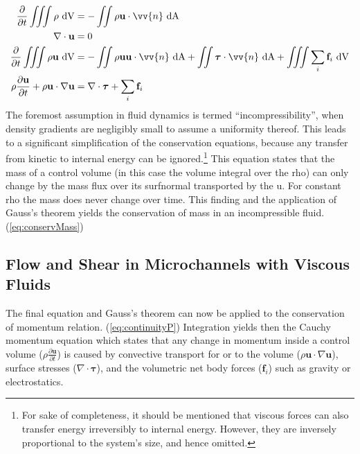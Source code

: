 \begin{align}
	\frac{\partial}{\partial t} \iiint \rho \ \mathrm{dV} &= - \iint \rho \mathbf{u} \cdot \vv{n} \ \mathrm{dA} \label{eq:continuityM}\\
	\nabla \cdot \mathbf{u} &= 0 \label{eq:conservMass}\\	
	\frac{\partial}{\partial t} \iiint \rho\mathbf{u} \ \mathrm{dV} &= - \iint \rho \mathbf{u}\mathbf{u} \cdot \vv{n} \ \mathrm{dA} + \iint \boldsymbol{\tau} \cdot \vv{n} \ \mathrm{dA}  + \iiint  \sum_{i}\mathbf{f}_i \ \mathrm{dV} \label{eq:continuityP} \\	
		\rho \frac{\partial \mathbf{u}}{\partial t} + \rho\mathbf{u} \cdot \nabla \mathbf{u} &= \nabla \cdot \boldsymbol{\tau} + \sum_{i}\mathbf{f}_i \label{eq:cauchymomentum} \\			
\end{align}
The foremost assumption in fluid dynamics is termed ``incompressibility'', when density gradients are negligibly small to assume a uniformity thereof. This leads to a significant simplification of the conservation equations, because any transfer from kinetic to internal energy can be ignored.\footnote{For sake of completeness, it should be mentioned that viscous forces can also transfer energy irreversibly to internal energy. However, they are inversely proportional to the system's size, and hence omitted.}
This equation states that the mass of a control volume (in this case the volume integral over the \gls{rho}) can only change by the mass flux over its \gls{surfnormal} transported by the \gls{u}. For constant \gls{rho} the mass does never change over time. This finding and the application of Gauss's theorem yields the conservation of mass in an incompressible fluid. (\cref{eq:conservMass})


\subsection{Flow and Shear in Microchannels with Viscous Fluids}
\label{sec:theo:flow_and_Shear}

The final equation and Gauss's theorem can now be applied to the conservation of momentum relation. (\cref{eq:continuityP}) Integration yields then the Cauchy momentum equation which states that any change in momentum inside a control volume ($\rho \frac{\partial \mathbf{u}}{\partial t}$) is caused by convective transport for or to the volume ($\rho\mathbf{u} \cdot \nabla \mathbf{u}$), surface stresses ($ \nabla \cdot \boldsymbol{\tau}$), and the volumetric net body forces ($\mathbf{f}_i$) such as gravity or electrostatics.

